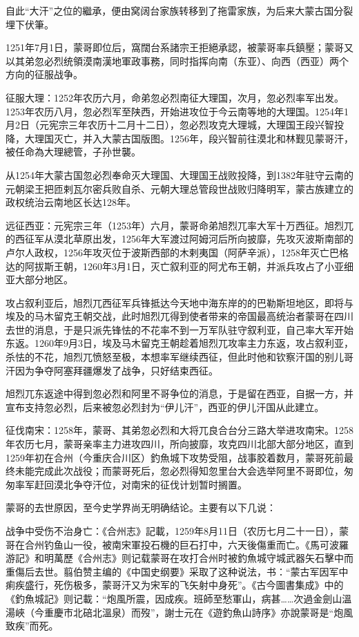 自此“大汗”之位的繼承，便由窝阔台家族转移到了拖雷家族，为后来大蒙古国分裂埋下伏筆。

1251年7月1日，蒙哥即位后，窩闊台系諸宗王拒絕承認，被蒙哥率兵鎮壓；蒙哥又以其弟忽必烈统領漠南漢地軍政事務，同时指挥向南（东亚）、向西（西亚）两个方向的征服战争。

征服大理：1252年农历六月，命弟忽必烈南征大理国，次月，忽必烈率军出发。1253年农历八月，忽必烈军至陕西，开始进攻位于今云南等地的大理国。1254年1月2日（元宪宗三年农历十二月十二日），忽必烈攻克大理城，大理国王段兴智投降，大理国灭亡，并入大蒙古国版图。1256年，段兴智前往漠北和林觐见蒙哥汗，被任命為大理總管，子孙世襲。

从1254年大蒙古国忽必烈奉命灭大理国、大理国王战败投降，到1382年驻守云南的元朝梁王把匝剌瓦尔密兵败自杀、元朝大理总管段世战败归降明军，蒙古族建立的政权统治云南地区长达128年。

远征西亚：元宪宗三年（1253年）六月，蒙哥命弟旭烈兀率大军十万西征。旭烈兀的西征军从漠北草原出发，1256年大军渡过阿姆河后所向披靡，先攻灭波斯南部的卢尔人政权，1256年攻灭位于波斯西部的木剌夷国（阿萨辛派），1258年灭亡巴格达的阿拔斯王朝，1260年3月1日，灭亡叙利亚的阿尤布王朝，并派兵攻占了小亚细亚大部分地区。

攻占叙利亚后，旭烈兀西征军兵锋抵达今天地中海东岸的的巴勒斯坦地区，即将与埃及的马木留克王朝交战，此时旭烈兀得到使者带来的帝国最高统治者蒙哥在四川去世的消息，于是只派先锋怯的不花率不到一万军队驻守叙利亚，自己率大军开始东返。1260年9月3日，埃及马木留克王朝趁着旭烈兀攻率主力东返，攻占叙利亚，杀怯的不花，旭烈兀愤怒至极，本想率军继续西征，但此时他和钦察汗国的别儿哥汗因为争夺阿塞拜疆爆发了战争，只好结束西征。

旭烈兀东返途中得到忽必烈和阿里不哥争位的消息，于是留在西亚，自据一方，并宣布支持忽必烈，后来被忽必烈封为“伊儿汗”，西亚的伊儿汗国从此建立。

征伐南宋：1258年，蒙哥、其弟忽必烈和大将兀良合台分三路大举进攻南宋。1258年农历七月，蒙哥亲率主力进攻四川，所向披靡，攻克四川北部大部分地区，直到1259年初在合州（今重庆合川区）釣魚城下攻势受阻，战事胶着数月，蒙哥死前最终未能完成此次战役；而蒙哥死后，忽必烈得知忽里台大会选举阿里不哥即位，匆匆率军赶回漠北争夺汗位，对南宋的征伐计划暂时搁置。

蒙哥的去世原因，至今史学界尚无明确结论。主要有以下几说：

战争中受伤不治身亡：《合州志》記載，1259年8月11日（农历七月二十一日），蒙哥在合州钓鱼山一役，被南宋軍投石機的巨石打中，六天後傷重而亡。《馬可波羅游記》和明萬歷《合州志》则记载蒙哥在攻打合州时被釣魚城守城武器矢石擊中而重傷后去世。翦伯赞主编的《中国史纲要》采取了这种说法，书：“蒙古军因军中痢疾盛行，死伤极多，蒙哥汗又为宋军的飞矢射中身死”。《古今圖書集成》中的《釣魚城記》则记載：“炮風所震，因成疾。班師至愁軍山，病甚……次過金劍山溫湯峽（今重慶市北碚北溫泉）而歿”，謝士元在《遊釣魚山詩序》亦說蒙哥是“炮風致疾”而死。

